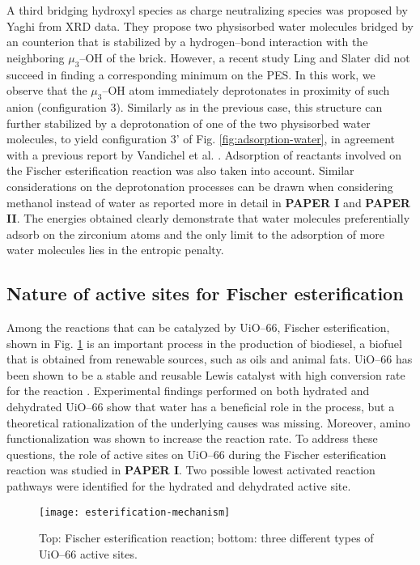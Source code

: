 A third bridging hydroxyl species as charge neutralizing species was proposed by Yaghi \cite{trickett2015definitive} from XRD data. They propose two physisorbed water molecules bridged by an  counterion that is stabilized by a hydrogen--bond interaction with the neighboring $\mu_3$--OH of the brick. However, a recent study Ling and Slater \cite{ling2016dynamic} did not succeed in finding a corresponding minimum on the PES. In this work, we observe that the $\mu_3$--OH atom immediately deprotonates in proximity of such  anion (configuration 3). Similarly as in the previous case, this structure can further stabilized by a deprotonation of one of the two physisorbed water molecules, to yield configuration 3’ of Fig. \ref{fig:adsorption-water}, in agreement with a previous report by Vandichel et al. \cite{vandichel2016water}. Adsorption of reactants involved on the Fischer esterification reaction was also taken into account. Similar considerations on the deprotonation processes can be drawn when considering methanol instead of water as reported more in detail in \textbf{PAPER I} and \textbf{PAPER II}. The energies obtained clearly demonstrate that water molecules preferentially adsorb on the zirconium atoms and the only limit to the adsorption of more water molecules lies in the entropic penalty. 

\subsection*{Nature of active sites for Fischer esterification}
 Among the reactions that can be catalyzed by UiO--66, Fischer esterification, shown in Fig. \ref{fig:esterification-mechanism} is an important process in the production of biodiesel, a biofuel that is obtained from renewable sources, such as oils and animal fats. UiO--66 has been shown to be a stable and reusable Lewis catalyst with high conversion rate for the reaction \cite{cirujano2015conversion, cirujano2015zirconium}. Experimental findings performed on both hydrated and dehydrated UiO--66 show that water has a beneficial role in the process, but a theoretical rationalization of the underlying causes was missing. Moreover, amino functionalization was shown to increase the reaction rate. To address these questions, the role of active sites on UiO--66 during the Fischer esterification reaction was studied in \textbf{PAPER I}. Two possible lowest activated reaction pathways were identified for the hydrated and dehydrated active site.
\begin{figure}[!htbp]
	\centering
	\texttt{[image: esterification-mechanism]}
	\caption{Top: Fischer esterification reaction; bottom: three different types of UiO--66 active sites.}
	\label{fig:esterification-mechanism}
\end{figure}

